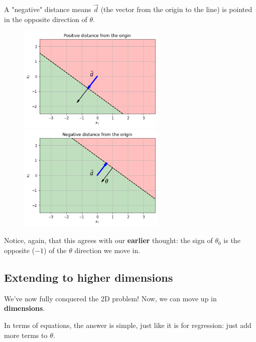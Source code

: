        A "negative" distance means $\vec{d}$ (the vector from the origin to the line) is pointed in the opposite direction of $\theta$.
        
        \begin{figure}[H]
            \includegraphics[width=70mm,scale=0.5]{images/classification_images/positive_distance.png}
            \includegraphics[width=70mm,scale=0.5]{images/classification_images/negative_distance.png}
            
        \end{figure}
        
        Notice, again, that this agrees with our \textbf{earlier} thought: the sign of $\theta_0$ is the opposite ($-1$) of the $\theta$ direction we move in.
        
    \subsection{Extending to higher dimensions}
    
        We've now fully conquered the 2D problem! Now, we can move up in \textbf{dimensions}.
        
        In terms of equations, the answer is simple, just like it is for regression: just add more terms to $\theta$.\\
        
